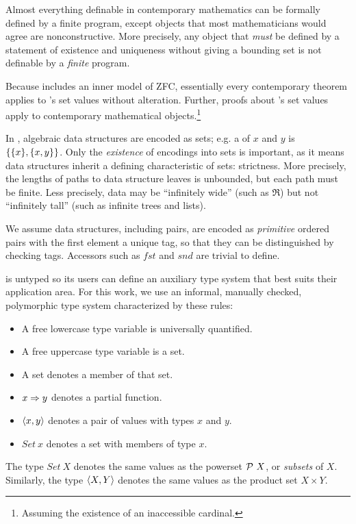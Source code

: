 \documentclass[preprint]{sigplanconf}
\begin{document}
Almost everything definable in contemporary mathematics can be formally defined by a finite \lzfclang program, except objects that most mathematicians would agree are nonconstructive.
More precisely, any object that \emph{must} be defined by a statement of existence and uniqueness without giving a bounding set is not definable by a \emph{finite} \lzfclang program.

Because \lzfclang includes an inner model of ZFC, essentially every contemporary theorem applies to \lzfclang's set values without alteration.
Further, proofs about \lzfclang's set values apply to contemporary mathematical objects.\footnote{Assuming the existence of an inaccessible cardinal.}

In \lzfclang, algebraic data structures are encoded as sets; e.g. a  of $x$ and $y$ is $\{{\{{x}\},\{{x,y}\}}\}$.
Only the \emph{existence} of encodings into sets is important, as it means data structures inherit a defining characteristic of sets: strictness.
More precisely, the lengths of paths to data structure leaves is unbounded, but each path must be finite.
Less precisely, data may be ``infinitely wide'' (such as $\Re$) but not ``infinitely tall'' (such as infinite trees and lists).

We assume data structures, including pairs, are encoded as \emph{primitive} ordered pairs with the first element a unique tag, so that they can be distinguished by checking tags.
Accessors such as $fst$ and $snd$ are trivial to define.

\lzfclang is untyped so its users can define an auxiliary type system that best suits their application area.
For this work, we use an informal, manually checked, polymorphic type system characterized by these rules:
\begin{itemize}
	\item A free lowercase type variable is universally quantified.
	\item A free uppercase type variable is a set.
	\item A set denotes a member of that set.
	\item $x \Rightarrow y$ denotes a partial function.
	\item $\langle{x,y}\rangle$ denotes a pair of values with types $x$ and $y$.
	\item $Set~x$ denotes a set with members of type $x$.
\end{itemize}
The type $Set~X$ denotes the same values as the powerset $\mathcal{P}~X$, or \emph{subsets} of $X$.
Similarly, the type $\langle{X,Y}\rangle$ denotes the same values as the product set $X \times Y$.
\end{document}
